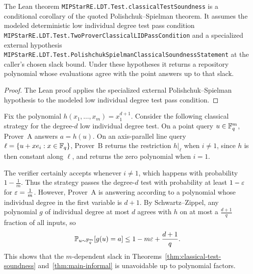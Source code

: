 \begin{proposition}\label{prop:lean-classical-test-soundness-interface}
	\leanok
	The Lean theorem \texttt{MIPStarRE.LDT.Test.classicalTestSoundness} is a
	conditional corollary of the quoted Polishchuk--Spielman theorem.  It assumes
	the modeled deterministic low individual degree test pass condition
	\texttt{MIPStarRE.LDT.Test.TwoProverClassicalLIDPassCondition} and a
	specialized external hypothesis
	\texttt{MIPStarRE.LDT.Test.PolishchukSpielmanClassicalSoundnessStatement}
	at the caller's chosen slack bound.  Under these hypotheses it returns a
	repository polynomial whose evaluations agree with the point answers up to
	that slack.
\end{proposition}
\begin{proof}
	\leanok
	The Lean proof applies the specialized external Polishchuk--Spielman
	hypothesis to the modeled low individual degree test pass condition.
\end{proof}

\begin{remark}\label{ex:bad-individual-degree-example}
		Fix the polynomial $h(x_1, \ldots, x_m) = x_1^{d+1}$. Consider the following classical strategy for the degree-$d$ low individual degree test. On a point query $u \in \mathbb{F}_q^m$, Prover~$\mathrm{A}$ answers $a = h(u)$. On an axis-parallel line query $\ell = \{u + x e_i : x \in \mathbb{F}_q\}$, Prover~$\mathrm{B}$ returns the restriction $h\vert_{\ell}$ when $i \neq 1$, since $h$ is then constant along $\ell$, and returns the zero polynomial when $i = 1$.

		The verifier certainly accepts whenever $i \neq 1$, which happens with probability $1 - \frac{1}{m}$. Thus the strategy passes the degree-$d$ test with probability at least $1-\varepsilon$ for $\varepsilon = \frac{1}{m}$. However, Prover~$\mathrm{A}$ is answering according to a polynomial whose individual degree in the first variable is $d+1$. By Schwartz--Zippel, any polynomial $g$ of individual degree at most $d$ agrees with $h$ on at most a $\frac{d+1}{q}$ fraction of all inputs, so
		\[
			\mathbb{P}_{u \sim \mathbb{F}_q^m}[g(u)=a] \le 1 - m\varepsilon + \frac{d+1}{q}.
		\]
		This shows that the $m$-dependent slack in Theorems~\ref{thm:classical-test-soundness} and~\ref{thm:main-informal} is unavoidable up to polynomial factors.
\end{remark}

